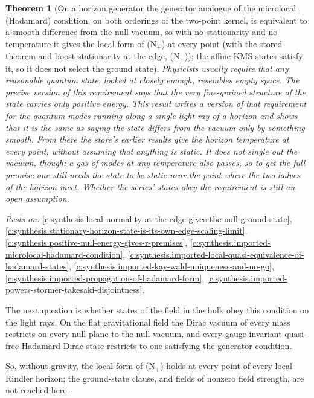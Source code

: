 \documentclass[11pt]{article}
\newtheorem{theorem}{Theorem}[section]
\theoremstyle{definition}
\theoremstyle{plain}
\begin{document}
\begin{theorem}[On a horizon generator the generator analogue of the microlocal (Hadamard) condition, on both orderings of the two-point kernel, is equivalent to a smooth difference from the null vacuum, so with no stationarity and no temperature it gives the local form of (N$_{+}$) at every point (with the stored theorem and boost stationarity at the edge, (N$_{+}$)); the affine-KMS states satisfy it, so it does not select the ground state]\label{c:synthesis.microlocal-condition-on-a-generator-gives-the-local-null-ground-state}
Physicists usually require that any reasonable quantum state, looked at closely enough, resembles empty space. The precise version of this requirement says that the very fine-grained structure of the state carries only positive energy. This result writes a version of that requirement for the quantum modes running along a single light ray of a horizon and shows that it is the same as saying the state differs from the vacuum only by something smooth. From there the store's earlier results give the horizon temperature at every point, without assuming that anything is static. It does not single out the vacuum, though: a gas of modes at any temperature also passes, so to get the full premise one still needs the state to be static near the point where the two halves of the horizon meet. Whether the series' states obey the requirement is still an open assumption.
\end{theorem}
\noindent\emph{Rests on:} \ref{c:synthesis.local-normality-at-the-edge-gives-the-null-ground-state}, \ref{c:synthesis.stationary-horizon-state-is-its-own-edge-scaling-limit}, \ref{c:synthesis.positive-null-energy-gives-r-premises}, \ref{c:synthesis.imported-microlocal-hadamard-condition}, \ref{c:synthesis.imported-local-quasi-equivalence-of-hadamard-states}, \ref{c:synthesis.imported-kay-wald-uniqueness-and-no-go}, \ref{c:synthesis.imported-propagation-of-hadamard-form}, \ref{c:synthesis.imported-powers-stormer-takesaki-disjointness}.

The next question is whether states of the field in the bulk obey this condition on the light rays. On the flat gravitational field the Dirac vacuum of every mass restricts on every null plane to the null vacuum, and every gauge-invariant quasi-free Hadamard Dirac state restricts to one satisfying the generator condition.

So, without gravity, the local form of (N$_{+}$) holds at every point of every local Rindler horizon; the ground-state clause, and fields of nonzero field strength, are not reached here.
\end{document}
